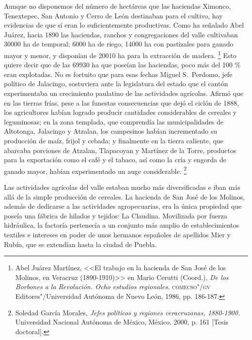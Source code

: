 \documentclass[14pt,twoside,final]{extbook} %
\let\oldfootnote\footnote
\renewcommand\footnote[1]{%
\oldfootnote{\hspace{1mm}#1}}
\begin{document}
Aunque no disponemos del número de hectáreas que las haciendas Ximonco, Tenextepec, San Antonio y Cerro de León destinaban para el cultivo, hay evidencias de que sí eran lo suficientemente productivas. Como ha señalado Abel Juárez, hacia 1890 las haciendas, ranchos y congregaciones del valle cultivaban 30000 ha de temporal; 6000 ha de riego, 14000 ha con pastizales para ganado mayor y menor, y disponían de 20010 ha para la extracción de madera.\footnote{Abel Juárez Martínez, <<El trabajo en la hacienda de San José de los Molinos, en Veracruz (\mbox{1890-1910})>> en Mario Cerutti (Coord.), \emph{De los Borbones a la Revolución. Ocho estudios regionales.} \textsc{comecso"/gv} Editores"/Universidad Autónoma de Nuevo León, 1986, pp. 186-187.} Esto quiere decir que de las 69930 ha que poseían las haciendas, poco más del 100 \% eran explotadas. No es fortuito que para esas fechas Miguel S.~Perdomo, jefe político de Jalacingo, sostuviera ante la legislatura del estado que el cantón experimentaba un crecimiento paulatino de las actividades agrícolas. Afirmó que en las tierras frías, pese a las funestas consecuencias que dejó el ciclón de 1888, los agricultores habían logrado producir cantidades considerables de cereales y leguminosas; en la zona templada, que comprendía las municipalidades de Altotonga, Jalacingo y Atzalan, los campesinos habían incrementado su producción de maíz, frijol y cebada; y finalmente en la tierra caliente, que abarcaba porciones de Atzalan, Tlapacoyan y Martínez de la Torre, productos para la exportación como el café y el tabaco, así como la cría y engorda de ganado mayor, habían experimentado un auge considerable.\footnote{Soledad García Morales, \emph{Jefes políticos y regiones veracruzanas, 1880-1900.} Universidad Nacional Autónoma de México, México, 2000, p. 161 [Tesis doctoral].}

Las actividades agrícolas del valle estaban mucho más diversificadas e iban más allá de la simple producción de cereales. La hacienda de San José de los Molinos, además de dedicarse a las actividades agropecuarias, era la única propiedad que poseía una fábrica de hilados y tejidos: La Claudina. Movilizada por fuerza hidráulica, la factoría pertenecía a un conjunto más amplio de establecimientos textiles e intereses en poder de unos hermanos españoles de apellidos Mier y Rubín, que se extendían hasta la ciudad de Puebla.
\end{document}
